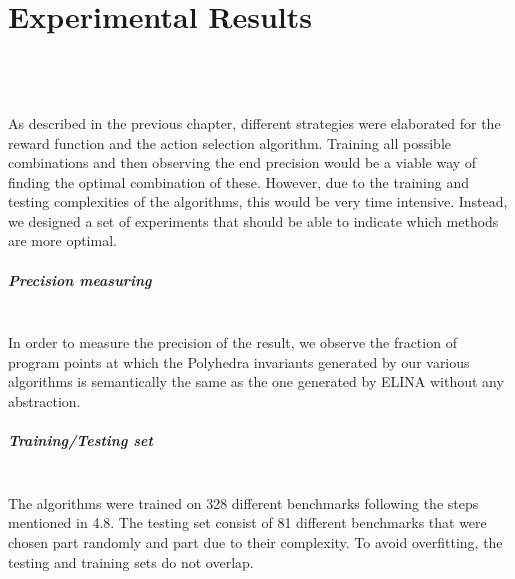 
\chapter{Experimental Results}
\mbox{}\\
\mbox{}\\
\mbox{}\\
As described in the previous chapter, different strategies were elaborated for the reward function and the action selection algorithm. Training all possible combinations and then observing the end precision would be a viable way of finding the optimal combination of these. However, due to the training and testing complexities of the algorithms, this would be very time intensive. Instead, we designed a set of experiments that should be able to indicate which methods are more optimal.
\paragraph{Precision measuring}\mbox{}\\
In order to measure the precision of the result, we observe the fraction of program points at which the Polyhedra invariants generated by our various algorithms is semantically the same as the one generated by ELINA without any abstraction.
\paragraph{Training/Testing set}\mbox{}\\
The algorithms were trained on 328 different benchmarks following the steps mentioned in 4.8. The testing set consist of 81 different benchmarks that were chosen part randomly and part due to their complexity. To avoid overfitting, the testing and training sets do not overlap.


